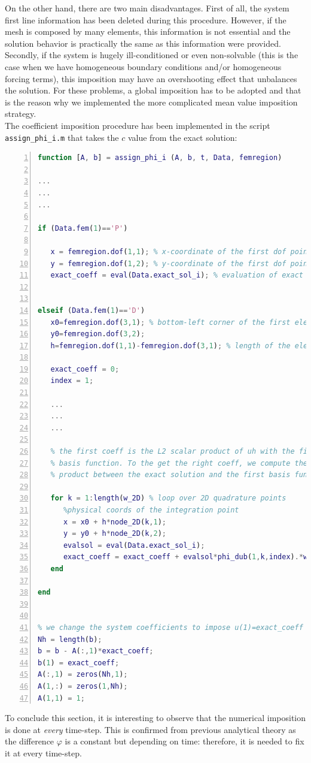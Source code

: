 \documentclass[a4paper,11pt]{article}
\begin{document}
\noindent On the other hand, there are two main disadvantages. First of all, the system first line information has been deleted during this procedure. However, if the mesh is composed by many elements, this information is not essential and the solution behavior is practically the same as this information were provided. \\
Secondly, if the system is hugely ill-conditioned or even non-solvable (this is the case when we have homogeneous boundary conditions and/or homogeneous forcing terms), this imposition may have an overshooting effect that unbalances the solution. For these problems, a global imposition has to be adopted and that is the reason why we implemented the more complicated mean value imposition strategy.\\

\noindent The coefficient imposition procedure has been implemented in the script \texttt{assign\_phi\_i.m} that takes the $c$ value from the exact solution: \\

\begin{lstlisting}[language=Matlab,basicstyle=\small, numbers=left, numberstyle=\tiny,  name = assign_phi_i.m, frame=single]
function [A, b] = assign_phi_i (A, b, t, Data, femregion)

...
...
...

if (Data.fem(1)=='P')

   x = femregion.dof(1,1); % x-coordinate of the first dof point
   y = femregion.dof(1,2); % y-coordinate of the first dof point
   exact_coeff = eval(Data.exact_sol_i); % evaluation of exact sol


elseif (Data.fem(1)=='D')
   x0=femregion.dof(3,1); % bottom-left corner of the first element
   y0=femregion.dof(3,2);
   h=femregion.dof(1,1)-femregion.dof(3,1); % length of the element

   exact_coeff = 0;
   index = 1;
   
   ...
   ...
   ...

   % the first coeff is the L2 scalar product of uh with the first
   % basis function. To the get the right coeff, we compute the scalar 
   % product between the exact solution and the first basis function
   
   for k = 1:length(w_2D) % loop over 2D quadrature points
      %physical coords of the integration point
      x = x0 + h*node_2D(k,1);  
      y = y0 + h*node_2D(k,2);
      evalsol = eval(Data.exact_sol_i);
      exact_coeff = exact_coeff + evalsol*phi_dub(1,k,index).*w_2D(k);
   end

end


% we change the system coefficients to impose u(1)=exact_coeff
Nh = length(b);
b = b - A(:,1)*exact_coeff;
b(1) = exact_coeff;  
A(:,1) = zeros(Nh,1);
A(1,:) = zeros(1,Nh);
A(1,1) = 1;
\end{lstlisting}
\vspace{4mm}
\noindent To conclude this section, it is interesting to observe that the numerical imposition is done at \emph{every} time-step. This is confirmed from previous analytical theory as the difference $\varphi$ is a constant but depending on time: therefore, it is needed to fix it at every time-step.
\end{document}
